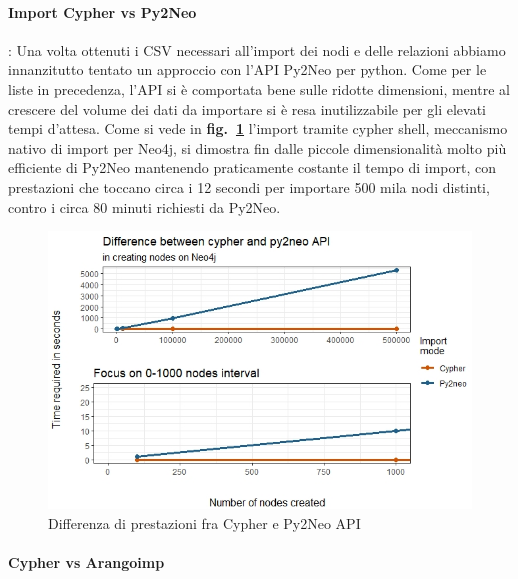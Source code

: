 \documentclass[fleqn,10pt]{SelfArx} %
\begin{document}
{\paragraph{Import Cypher vs Py2Neo}: Una volta ottenuti i CSV necessari all'import dei nodi e delle relazioni abbiamo innanzitutto tentato un approccio con l'API Py2Neo per python. Come per le liste in precedenza, l'API si è comportata bene sulle ridotte dimensioni, mentre al crescere del volume dei dati da importare si è resa inutilizzabile per gli elevati tempi d'attesa. Come si vede in \textbf{fig.~\ref{plot_cypher_py2neo}} l'import tramite cypher shell, meccanismo nativo di import per Neo4j, si dimostra fin dalle piccole dimensionalità molto più efficiente di Py2Neo mantenendo praticamente costante il tempo di import, con prestazioni che toccano circa i 12 secondi per importare 500 mila nodi distinti, contro i circa 80 minuti richiesti da Py2Neo.
\begin{figure}
\centering
\includegraphics[scale=0.54]{viz_benchmark_cypher_py2neo.jpeg}
\caption{\label{plot_cypher_py2neo} Differenza di prestazioni fra Cypher e Py2Neo API}
\end{figure}
\paragraph{Cypher vs Arangoimp}
}
\end{document}
